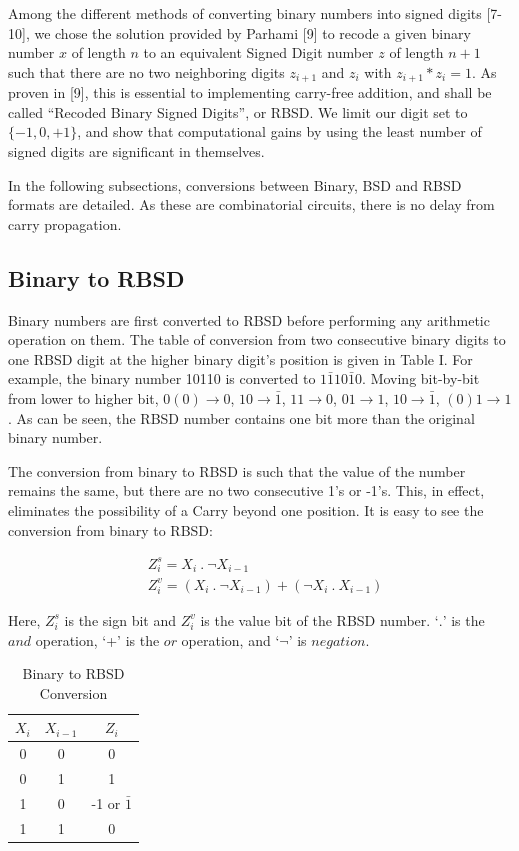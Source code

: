 \documentclass[conference]{IEEEtran}
\begin{document}
Among the different methods of converting binary numbers into signed digits [7-10], we chose  the solution provided by Parhami [9] to recode a given binary number $x$ of length $n$ to an equivalent Signed Digit number $z$ of length $n+1$ such that there are no two neighboring digits $z_{i+1}$ and $z_{i}$ with $z_{i+1} * z_{i} = 1$. As proven in [9], this is essential to implementing carry-free addition, and shall be called ``Recoded Binary Signed Digits'', or RBSD. We limit our digit set to $\{-1, 0, +1\}$, and show that computational gains by using the least number of signed digits are significant in themselves.

In the following subsections, conversions between Binary, BSD and RBSD formats are detailed. As these are combinatorial circuits, there is no delay from carry propagation.

\subsection{Binary to RBSD}

Binary numbers are first converted to RBSD before performing any arithmetic operation on them. The table of conversion from two consecutive binary digits to one RBSD digit at the higher binary digit’s position is given in Table I. For example, the binary number 10110 is converted to $1\bar{1}10\bar{1}0$. Moving bit-by-bit from lower to higher bit, $0(0) \to 0$, $10 \to \bar{1}$, $11 \to 0$, $01 \to 1$, $10 \to \bar{1}$, $(0)1 \to 1$. As can be seen, the RBSD number contains one bit more than the original binary number.

The conversion from binary to RBSD is such that the value of the number remains the same, but there are no two consecutive 1’s or -1’s. This, in effect, eliminates the possibility of a Carry beyond one position. It is easy to see the conversion from binary to RBSD:

\vspace{-1em}
\begin{align}
&Z_{i}^{s} = X_{i} \ . \ \neg X_{i-1} \\
&Z_{i}^{v} = (X_{i} \ . \ \neg X_{i-1}) + (\neg X_{i} \ . \ X_{i-1})
\end{align}

Here, $Z_{i}^{s}$ is the sign bit and $Z_{i}^{v}$  is the value bit of the RBSD number. `$.$' is the $and$ operation, `+' is the $or$ operation, and `$\neg$' is $negation$.

\vspace{-.5em}
\begin{table}[h!]
  \centering
  \caption{Binary to RBSD Conversion}
  \label{tab:table1}
  \begin{tabular}{|c|c||c|}
    \hline
    $X_{i}$ & $X_{i-1}$ & $Z_{i}$ \\
    \hline
    \hline
    0 & 0 & 0\\
    \hline
    0 & 1 & 1\\
    \hline
    1 & 0 & -1 or $\bar{1}$\\
    \hline
    1 & 1 & 0\\
    \hline
  \end{tabular}
\end{table}
\end{document}
